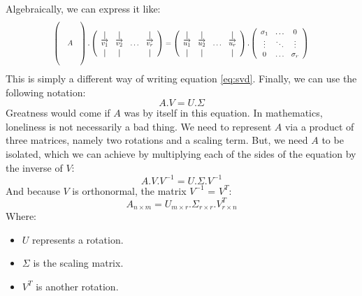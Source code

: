 \documentclass[600paper, 11pt,twoside,openany]{kdp}
\begin{document}
\indent Algebraically, we can express it like:
\[\scalebox{.75}{$\displaystyle \begin{pmatrix}
  \\
 & &  \\
 & A  \\
 & &  \\
  \\
\end{pmatrix} . 
\left(
  \begin{array}{cccc}
    \vertbar & \vertbar &        & \vertbar \\
  \overrightarrow{v_1}    &    \overrightarrow{v_2}    & \ldots &\overrightarrow{v_r}     \\
    \vertbar & \vertbar &        & \vertbar 
  \end{array}
\right) = 
\left(
  \begin{array}{cccc}
    \vertbar & \vertbar &        & \vertbar \\
  \overrightarrow{u_1}    &    \overrightarrow{u_2}    & \ldots &\overrightarrow{u_r}     \\
    \vertbar & \vertbar &        & \vertbar 
  \end{array}
\right).
\left(
  \begin{array}{cccc}
    \sigma_1 & \hdots & 0 \\
     \vdots   &    \ddots    & \vdots    \\
    0 & \hdots &    \sigma_r  \\
  \end{array}
\right)$}
\]
\indent This is simply a different way of writing equation \ref{eq:svd}. Finally, we can use the following notation:
\[A.V = U.\Sigma \]
\indent Greatness would come if $A$  was by itself in this equation. In mathematics, loneliness is not necessarily a bad thing. We need to represent $A$ via a product of three matrices, namely two rotations and a scaling term. But, we need $A$ to be isolated, which we can achieve by multiplying each of the sides of the equation by the inverse of $V$:
\[A.V.V^{-1}=U.\Sigma.V^{-1}\]
\indent And because $V$ is orthonormal, the matrix $V^{-1}$ = $V^T$:
\begin{equation} \label{eq:tSVD}
A_{n \times m} = U_{m \times r}.\Sigma_{r \times r}.V^{T}_{r \times n}
\end{equation}
\indent Where:
\begin{tcolorbox}
\begin{itemize}
\item $U$ represents a rotation.
\item $\Sigma$ is the scaling matrix.
\item $V^{T}$ is another rotation.
\end{itemize}
\end{tcolorbox}
\end{document}

